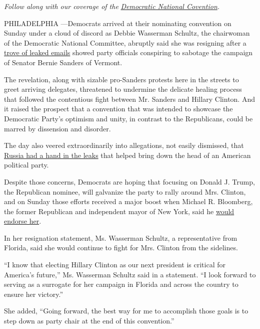 \emph{Follow along with our coverage of the}
\href{http://www.nytimes3xbfgragh.onion/2016/07/25/us/politics/democratic-national-convention.html}{\emph{Democratic
National Covention}}\emph{.}

PHILADELPHIA ---Democrats arrived at their nominating convention on
Sunday under a cloud of discord as Debbie Wasserman Schultz, the
chairwoman of the Democratic National Committee, abruptly said she was
resigning after a
\href{http://www.nytimes3xbfgragh.onion/2016/07/23/us/politics/dnc-emails-sanders-clinton.html?ref=politics}{trove
of leaked emails} showed party officials conspiring to sabotage the
campaign of Senator Bernie Sanders of Vermont.

The revelation, along with sizable pro-Sanders protests here in the
streets to greet arriving delegates, threatened to undermine the
delicate healing process that followed the contentious fight between Mr.
Sanders and Hillary Clinton. And it raised the prospect that a
convention that was intended to showcase the Democratic Party's optimism
and unity, in contrast to the Republicans, could be marred by dissension
and disorder.

The day also veered extraordinarily into allegations, not easily
dismissed, that
\href{http://www.nytimes3xbfgragh.onion/2016/07/25/us/politics/donald-trump-russia-emails.html}{Russia
had a hand in the leaks} that helped bring down the head of an American
political party.

Despite those concerns, Democrats are hoping that focusing on Donald J.
Trump, the Republican nominee, will galvanize the party to rally around
Mrs. Clinton, and on Sunday those efforts received a major boost when
Michael R. Bloomberg, the former Republican and independent mayor of New
York, said he
\href{http://www.nytimes3xbfgragh.onion/2016/07/25/us/politics/michael-bloomberg-hillary-clinton-dnc.html}{would
endorse her}.

In her resignation statement, Ms. Wasserman Schultz, a representative
from Florida, said she would continue to fight for Mrs. Clinton from the
sidelines.

``I know that electing Hillary Clinton as our next president is critical
for America's future,'' Ms. Wasserman Schultz said in a statement. ``I
look forward to serving as a surrogate for her campaign in Florida and
across the country to ensure her victory.''

She added, ``Going forward, the best way for me to accomplish those
goals is to step down as party chair at the end of this convention.''

